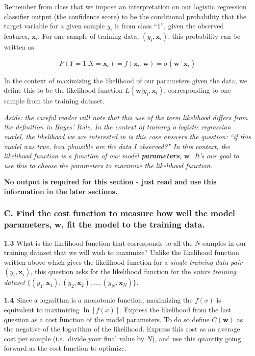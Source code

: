 \documentclass[
  letterpaper,
  DIV=11,
  numbers=noendperiod]{scrartcl}
\begin{document}
Remember from class that we impose an interpretation on our logistic
regression classifier output (the confidence score) to be the
conditional probability that the target variable for a given sample
\(y_i\) is from class ``1'', given the observed features,
\(\mathbf{x}_i\). For one sample of training data,
\((y_i, \mathbf{x}_i)\), this probability can be written as:

\[P(Y=1|X=\mathbf{x}_i) = f(\mathbf{x}_i,\mathbf{w})=\sigma(\mathbf{w}^{\top} \mathbf{x}_i)\]

In the context of maximizing the likelihood of our parameters given the
data, we define this to be the likelihood function
\(L(\mathbf{w}|y_i,\mathbf{x}_i)\), corresponding to one sample from the
training dataset.

\emph{Aside: the careful reader will note that this use of the term
likelihood differs from the definition in Bayes' Rule. In the context of
training a logistic regression model, the likelihood we are interested
in is this case answers the question: ``if this model was true, how
plausible are the data I observed?'' In this context, the likelihood
function is a function of our model \textbf{parameters}, \(\mathbf{w}\).
It's our goal to use this to choose the parameters to maximize the
likelihood function.}

\textbf{No output is required for this section - just read and use this
information in the later sections.}

\subsubsection{\texorpdfstring{C. Find the cost function to measure how
well the model parameters, \(\mathbf{w}\), fit the model to the training
data.}{C. Find the cost function to measure how well the model parameters, \textbackslash mathbf\{w\}, fit the model to the training data.}}\label{c.-find-the-cost-function-to-measure-how-well-the-model-parameters-mathbfw-fit-the-model-to-the-training-data.}

\textbf{1.3} What is the likelihood function that corresponds to all the
\(N\) samples in our training dataset that we will wish to maximize?
Unlike the likelihood function written above which gives the likelihood
function for a \emph{single training data pair} \((y_i, \mathbf{x}_i)\),
this question asks for the likelihood function for the \emph{entire
training dataset}
\(\{(y_1, \mathbf{x}_1), (y_2, \mathbf{x}_2), ..., (y_N, \mathbf{x}_N)\}\).

\textbf{1.4} Since a logarithm is a monotonic function, maximizing the
\(f(x)\) is equivalent to maximizing \(\ln [f(x)]\). Express the
likelihood from the last question as a cost function of the model
parameters. To do so define \(C(\mathbf{w})\) as the negative of the
logarithm of the likelihood. Express this cost as an average cost per
sample (i.e.~divide your final value by \(N\)), and use this quantity
going forward as the cost function to optimize.
\end{document}
